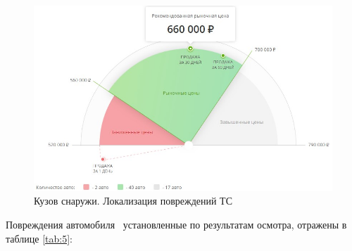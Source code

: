   \begin{figure}[!h]
	\centering
	\includegraphics[width=0.98\linewidth]{images/1}
	\caption{{\footnotesize {Кузов снаружи. Локализация повреждений ТС }}}
	\label{ris:images/1}
\end{figure}


\indent Повреждения автомобиля \, установленные по результатам осмотра, отражены в таблице \ref{tab:5}: 

